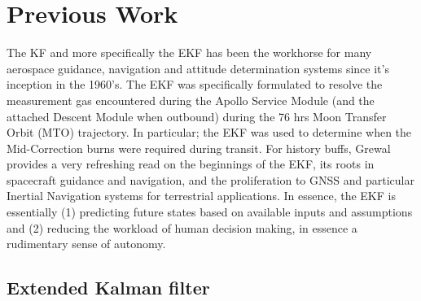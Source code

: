 \section{Previous Work}\label{CHAP1_3}

The KF and more specifically the EKF has been the workhorse for many aerospace guidance, navigation and attitude determination systems since it's inception in the 1960's. The EKF was specifically formulated to resolve the measurement gas encountered during the Apollo Service Module (and the attached Descent Module when outbound) during the 76 hrs Moon Transfer Orbit (MTO) trajectory. In particular; the EKF was used to determine when the Mid-Correction burns were required during transit. For history buffs, Grewal \cite{grewalKFHistory10} provides a very refreshing read on the beginnings of the EKF, its roots in spacecraft guidance and navigation, and the proliferation to GNSS and particular Inertial Navigation systems for terrestrial applications. In essence, the EKF is essentially (1) predicting  future states based on available inputs and assumptions \cite{hashim2021attitude} and (2) reducing the workload of human decision making, in essence a rudimentary sense of autonomy.

\subsection{Extended Kalman filter}\label{CHAP1_3_1}

